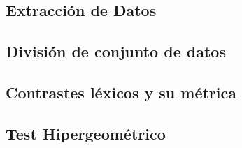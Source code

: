 
\subsection{Extracción de Datos}

\subsection{División de conjunto de datos}

\subsection{Contrastes léxicos y su métrica}

\subsection{Test Hipergeométrico}